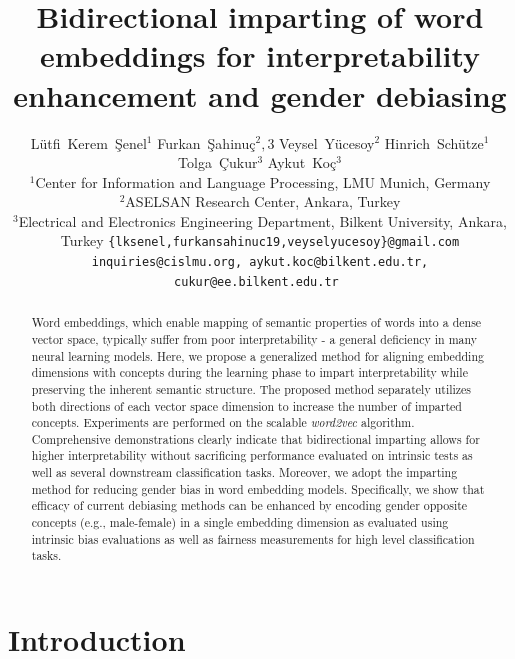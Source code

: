 \documentclass[11pt,a4paper]{article}
\title{Bidirectional imparting of word embeddings for interpretability enhancement and gender debiasing}
\author{Lütfi~Kerem~Şenel$^1$ \And Furkan~Şahinuç$^2,3$ \And Veysel~Yücesoy$^2$ \And Hinrich~Schütze$^1$ \And Tolga~Çukur$^3$ \And Aykut~Koç$^3$\\
  $^1$Center for Information and Language Processing, LMU Munich, Germany \\
  $^2$ASELSAN Research Center, Ankara, Turkey \\
  $^3$Electrical and Electronics Engineering Department, Bilkent University, Ankara, Turkey
  \texttt{\{lksenel,furkansahinuc19,veyselyucesoy\}@gmail.com}\\
  \texttt{inquiries@cislmu.org, aykut.koc@bilkent.edu.tr, cukur@ee.bilkent.edu.tr } \\}
\date{}
\begin{document}
\maketitle
\begin{abstract}
Word embeddings, which enable mapping of semantic properties of words into a dense vector space, typically suffer from poor interpretability - a general deficiency in many neural learning models. 
Here, we propose a generalized method for aligning embedding dimensions with concepts during the learning phase to impart interpretability while preserving the inherent semantic structure. 
The proposed method separately utilizes both directions of each vector space dimension to increase the number of imparted concepts.
Experiments are performed on the scalable \textit{word2vec} algorithm.
Comprehensive demonstrations clearly indicate that bidirectional imparting allows for higher interpretability without sacrificing performance evaluated on intrinsic tests as well as several downstream classification tasks.
Moreover, we adopt the imparting method for reducing gender bias in word embedding models. Specifically, we show that efficacy of current debiasing methods can be enhanced by encoding gender opposite concepts (e.g., male-female) in a single embedding dimension as evaluated using intrinsic bias evaluations as well as fairness measurements for high level classification tasks.
\end{abstract}

\section{Introduction}\label{sec:intro}
\end{document}
